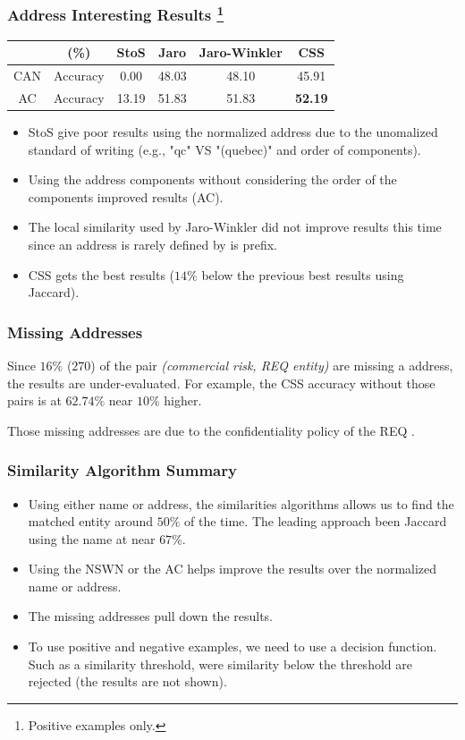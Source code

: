 \documentclass{beamer}
\begin{document}
	\begin{frame}\frametitle{Address Interesting Results \footnote{Positive examples only.}}
		\begin{table}[]
		\begin{tabular}{cccccc}
				\toprule
				& (\%)       & StoS   & Jaro  & Jaro-Winkler & CSS \\
				\midrule
				CAN      & Accuracy & 0.00 & 48.03 & 48.10 & 45.91        \\
				AC & Accuracy & 13.19 & 51.83 & 51.83 & \textbf{52.19}    
				\\\bottomrule
			\end{tabular}
		\end{table}
		\begin{itemize}
			\item<1-> StoS give poor results using the normalized address due to the unomalized standard of writing (e.g., "qc" VS "(quebec)" and order of components).
			\item<2-> Using the address components without considering the order of the components improved results (AC).
			\item<3-> The local similarity used by Jaro-Winkler did not improve results this time since an address is rarely defined by is prefix.
			\item<4-> CSS gets the best results ($14\%$ below the previous best results using Jaccard).
		\end{itemize}
	\end{frame}
	
	\begin{frame}\frametitle{Missing Addresses}
		Since $16\%$ ($270$) of the pair \textit{(commercial risk, REQ entity)} are missing a address, the results are under-evaluated. For example, the CSS accuracy without those pairs is at $62.74\%$ near $10\%$ higher. \\\bigskip
		
		Those missing addresses are due to the confidentiality policy of the REQ \cite{guidereq}.
	\end{frame}
	
	\begin{frame}\frametitle{Similarity Algorithm Summary}
		\begin{itemize}
			\item<1-> Using either name or address, the similarities algorithms allows us to find the matched entity around $50\%$ of the time. The leading approach been Jaccard using the name at near $67\%$.
			\item<2-> Using the NSWN or the AC helps improve the results over the normalized name or address.
			\item<3-> The missing addresses pull down the results.
			\item<4-> To use positive and negative examples, we need to use a decision function. Such as a similarity threshold, were similarity below the threshold are rejected (the results are not shown). 
		\end{itemize}
	\end{frame}
	
\end{document}

